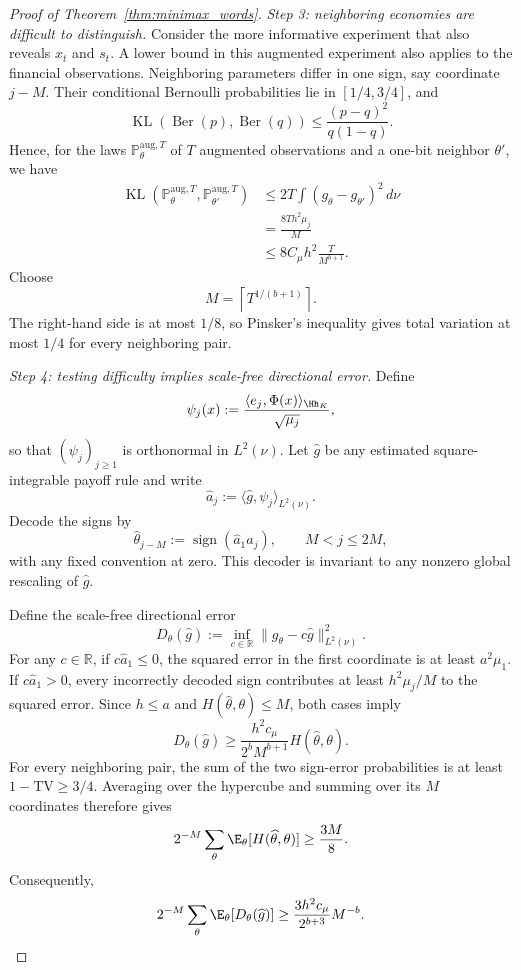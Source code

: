 \begin{proof}[Proof of Theorem~\ref{thm:minimax_words}]
\medskip
\noindent\textit{Step 3: neighboring economies are difficult to distinguish.}
Consider the more informative experiment that also reveals $x_t$ and $s_t$.
A lower bound in this augmented experiment also applies to the financial
observations. Neighboring parameters differ in one sign, say coordinate
$j-M$. Their conditional Bernoulli probabilities lie in $[1/4,3/4]$, and
\[
\operatorname{KL}(\operatorname{Ber}(p),\operatorname{Ber}(q))
\leq
\frac{(p-q)^2}{q(1-q)}.
\]
Hence, for the laws $\mathbb P^{\mathrm{aug},T}_\theta$ of $T$ augmented
observations and a one-bit neighbor $\theta'$, we have
\[
\begin{aligned}
\operatorname{KL}(\mathbb P^{\mathrm{aug},T}_\theta,
                  \mathbb P^{\mathrm{aug},T}_{\theta'})
&\leq
2T\int(g_\theta-g_{\theta'})^2\,d\nu\\
&=
\frac{8Th^2\mu_j}{M}\\
&\leq
8C_\mu h^2\frac{T}{M^{b+1}}.
\end{aligned}
\]
Choose
\[
M=\left\lceil T^{1/(b+1)}\right\rceil.
\]
The right-hand side is at most $1/8$, so Pinsker's inequality gives total
variation at most $1/4$ for every neighboring pair.

\medskip
\noindent\textit{Step 4: testing difficulty implies scale-free directional error.}
Define
\[
\psi_j(x)
:=
\frac{\langle e_j,\Phi(x)\rangle_{\Hh_K}}{\sqrt{\mu_j}},
\]
so that $(\psi_j)_{j\geq1}$ is orthonormal in $L^2(\nu)$. Let $\widehat g$
be any estimated square-integrable payoff rule and write
\[
\widehat a_j
:=
\langle\widehat g,\psi_j\rangle_{L^2(\nu)}.
\]
Decode the signs by
\[
\widehat\theta_{j-M}
:=
\operatorname{sign}(\widehat a_1\widehat a_j),
\qquad M<j\leq2M,
\]
with any fixed convention at zero. This decoder is invariant to any nonzero
global rescaling of $\widehat g$.

Define the scale-free directional error
\[
D_\theta(\widehat g)
:=
\inf_{c\in\mathbb R}
\|g_\theta-c\widehat g\|_{L^2(\nu)}^2.
\]
For any $c\in\mathbb R$, if $c\widehat a_1\leq0$, the squared error in the
first coordinate is at least $a^2\mu_1$. If $c\widehat a_1>0$, every
incorrectly decoded sign contributes at least $h^2\mu_j/M$ to the squared
error. Since $h\leq a$ and $H(\widehat\theta,\theta)\leq M$, both cases
imply
\[
D_\theta(\widehat g)
\geq
\frac{h^2c_\mu}{2^bM^{b+1}}
H(\widehat\theta,\theta).
\]
For every neighboring pair, the sum of the two sign-error probabilities is at
least $1-\mathrm{TV}\geq3/4$. Averaging over the hypercube and summing over
its $M$ coordinates therefore gives
\[
2^{-M}\sum_\theta
\E_\theta[H(\widehat\theta,\theta)]
\geq
\frac{3M}{8}.
\]
Consequently,
\[
2^{-M}\sum_\theta
\E_\theta[D_\theta(\widehat g)]
\geq
\frac{3h^2c_\mu}{2^{b+3}}M^{-b}.
\]


\end{proof}
